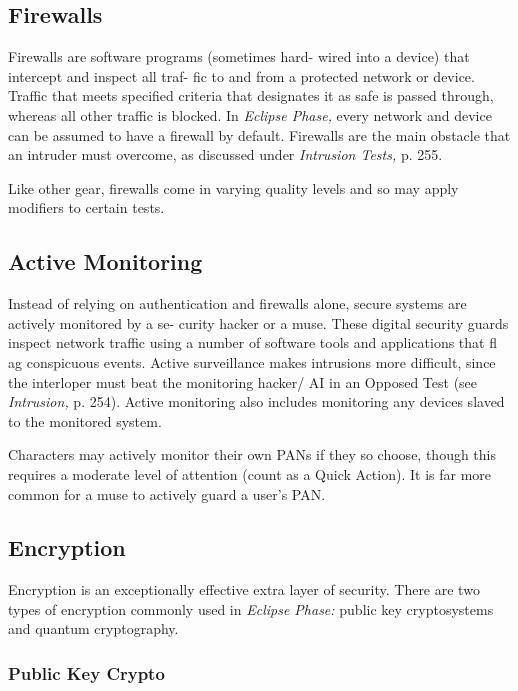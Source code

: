 \subsection{Firewalls}

Firewalls are software programs (sometimes hard-
wired into a device) that intercept and inspect all traf-
fic to and from a protected network or device. Traffic 
that meets specified criteria that designates it as safe 
is passed through, whereas all other traffic is blocked. 
In \textit{Eclipse Phase,} every network and device can be 
assumed to have a firewall by default. Firewalls are 
the main obstacle that an intruder must overcome, as 
discussed under \textit{Intrusion Tests,} p. 255.

Like other gear, firewalls come in varying quality 
levels and so may apply modifiers to certain tests.

\subsection{Active Monitoring}

Instead of relying on authentication and firewalls 
alone, secure systems are actively monitored by a se-
curity hacker or a muse. These digital security guards 
inspect network traffic using a number of software 
tools and applications that fl ag conspicuous events. 
Active surveillance makes intrusions more difficult, 
since the interloper must beat the monitoring hacker/
AI in an Opposed Test (see \textit{Intrusion,} p. 254). Active 
monitoring also includes monitoring any devices 
slaved to the monitored system.

Characters may actively monitor their own PANs if 
they so choose, though this requires a moderate level 
of attention (count as a Quick Action). It is far more 
common for a muse to actively guard a user's PAN.

\subsection{Encryption}

Encryption is an exceptionally effective extra layer of 
security. There are two types of encryption commonly 
used in \textit{Eclipse Phase:} public key cryptosystems and 
quantum cryptography.

\subsubsection{Public Key Crypto}

